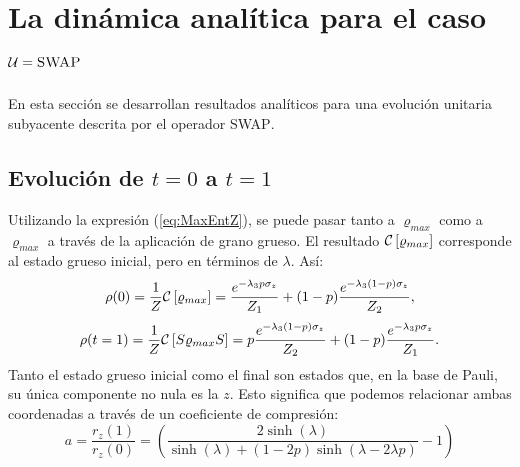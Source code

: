 \section{La dinámica analítica para el caso $\mathcal{U}=\textsc{SWAP}$}
En esta sección se desarrollan resultados analíticos para una evolución unitaria subyacente descrita por el operador \textsc{SWAP}.

\subsection{Evolución de $t=0$ a $t=1$}

Utilizando la expresión (\ref{eq:MaxEntZ}), se puede pasar tanto a $\varrho_{max}$ como a $\varrho_{max}$ a través de la aplicación de grano grueso. El resultado $\mathcal{C}\left[\varrho_{max}\right]$ corresponde al estado grueso inicial, pero en términos de $\lambda$. Así:
\begin{equation}
\rho(0)=\frac{1}{Z}\mathcal{C}\left[\varrho_{max}\right]=\frac{e^{-\lambda_{3}p\sigma_{z}}}{Z_{1}}+(1-p)\frac{e^{-\lambda_{3}(1-p)\sigma_{z}}}{Z_{2}},
\end{equation}
\begin{equation}
\rho(t=1)=\frac{1}{Z}\mathcal{C}\left[S\varrho_{max} S\right]=p\frac{e^{-\lambda_{3}(1-p)\sigma_{z}}}{Z_{2}}+(1-p)\frac{e^{-\lambda_{3}p\sigma_{z}}}{Z_{1}}.
\end{equation}
Tanto el estado grueso inicial como el final son estados que, en la base de Pauli, su única componente no nula es la $z$. Esto significa que podemos relacionar ambas coordenadas a través de un coeficiente de compresión:
\begin{equation}\label{eq:SWAPFactor}
            a=\frac{r_{z}(1)}{r_{z}(0)}=\left(\frac{2 \sinh (\lambda )}{\sinh (\lambda )+(1-2 p) \sinh (\lambda -2 \lambda  p)}-1\right)
\end{equation}
